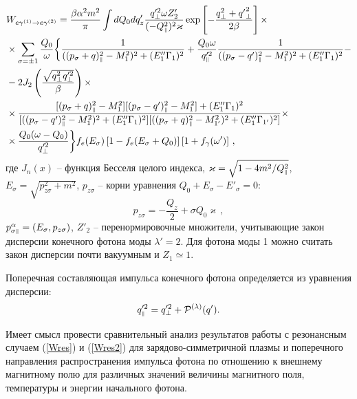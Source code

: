 \begin{equation}
	\begin{aligned}\label{Wres2}
		&W_{e\gamma^{(1)}\to e\gamma^{(2)}}=\frac{\beta\alpha^2m^2}{\pi} \int 
		dQ_0dq'_z \frac{q_\perp'^2\omega Z_2'} 
		{(-Q_{\mbox{\tiny $\|$}}^2)^2\varkappa}\exp\left[-\frac{q_\perp^2+{q'}_\perp^2}{2\beta}\right]
		\times
		\\
		\nonumber&\times\sum_{\sigma=\pm 
			1}\frac{Q_0}{\omega}\bigg\{
		\frac{1}{((p_\sigma+q)_{\mbox{\tiny $\|$}}^2-M_1^2)^2+(E''_1\Gamma_1)^2}+\frac{Q_0 \omega}{ q'^2_{\mbox{\tiny $\|$}}}\frac{1}{((p_\sigma-q')_{\mbox{\tiny $\|$}}^2-M_1^2)^2+(E''_1\Gamma_1)^2}-
		\\
		\nonumber&-2 J_{2}\left(\frac{\sqrt{q_\perp^2q_\perp'^2}}{\beta}\right)
		\times
		\\
		\nonumber&\times\frac{[(p_\sigma+q)^2_{\mbox{\tiny $\|$}}-M_1^2][(p_\sigma-q')^2_{\mbox{\tiny $\|$}}-M^2_{1}]+(E''_1\Gamma_1)^2}{[((p_\sigma-q')_{\mbox{\tiny $\|$}}^2-M_1^2)^2+(E''_1\Gamma_1)^2][((p_\sigma+q)_{\mbox{\tiny $\|$}}^2-M_{1'}^2)^2+(E''_1\Gamma_{1'})^2]}
		\times
		\\
		\nonumber&\times
		\frac{Q_0(\omega-Q_0)}{q'^2_\perp}
		\bigg\}f_e{(E_\sigma)}\left[1-f_e{(E_\sigma+Q_0)}\right]\left[1+f_\gamma(\omega')\right]
		\, ,
	\end{aligned}
\end{equation}
\noindent где $J_n(x)$ -- функция Бесселя целого индекса, 
\mbox{$\varkappa = \sqrt{1 - 4m^2/Q^2_{\mbox{\tiny $\|$}}}$, 
	$E_\sigma=\sqrt{p_{z\sigma}^2+m^2}$}, $p_{z\sigma}$ -- корни уравнения 
$Q_0+E_\sigma-E'_\sigma=0$:
\begin{equation}\label{savelaw}
	p_{z\sigma}=-\frac{Q_z}{2}+ \sigma Q_0 \varkappa\, ,
\end{equation}
$p^\alpha_{\sigma\mbox{\tiny $\|$}}=(E_\sigma,p_{z\sigma})$, $Z'_{2}$ -- перенормировочные множители, учитывающие закон дисперсии конечного фотона моды $\lambda' = 2$. Для фотона моды 1 можно считать закон дисперсии почти вакуумным и $Z_1\simeq 1$.

Поперечная составляющая импульса конечного фотона определяется из уравнения 
дисперсии:
\begin{equation}
	q'^2_{\mbox{\tiny $\|$}}=q'^{2}_\perp + {\cal P}^{(\lambda)}(q') .
\end{equation}

Имеет смысл провести сравнительный анализ результатов работы \cite{Chistyakov:2009}  с резонансным случаем (\ref{Wres}) и (\ref{Wres2}) для зарядово-симметричной плазмы и поперечного направления распространения импульса фотона по отношению к внешнему магнитному полю для различных значений величины магнитного поля, температуры и энергии начального фотона.

